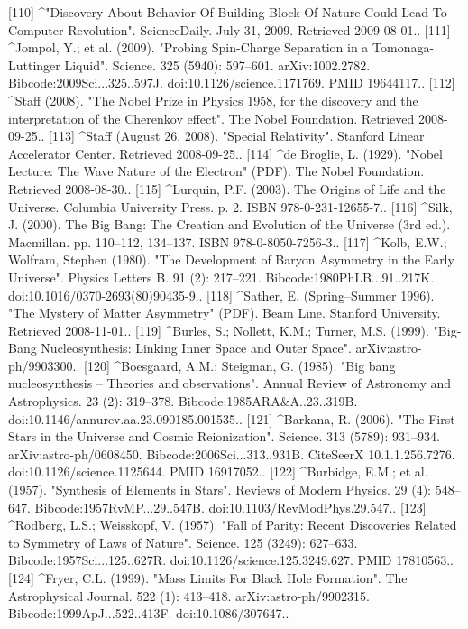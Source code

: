 [110]
^"Discovery About Behavior Of Building Block Of Nature Could Lead To Computer Revolution". ScienceDaily. July 31, 2009. Retrieved 2009-08-01..
[111]
^Jompol, Y.; et al. (2009). "Probing Spin-Charge Separation in a Tomonaga-Luttinger Liquid". Science. 325 (5940): 597–601. arXiv:1002.2782. Bibcode:2009Sci...325..597J. doi:10.1126/science.1171769. PMID 19644117..
[112]
^Staff (2008). "The Nobel Prize in Physics 1958, for the discovery and the interpretation of the Cherenkov effect". The Nobel Foundation. Retrieved 2008-09-25..
[113]
^Staff (August 26, 2008). "Special Relativity". Stanford Linear Accelerator Center. Retrieved 2008-09-25..
[114]
^de Broglie, L. (1929). "Nobel Lecture: The Wave Nature of the Electron" (PDF). The Nobel Foundation. Retrieved 2008-08-30..
[115]
^Lurquin, P.F. (2003). The Origins of Life and the Universe. Columbia University Press. p. 2. ISBN 978-0-231-12655-7..
[116]
^Silk, J. (2000). The Big Bang: The Creation and Evolution of the Universe (3rd ed.). Macmillan. pp. 110–112, 134–137. ISBN 978-0-8050-7256-3..
[117]
^Kolb, E.W.; Wolfram, Stephen (1980). "The Development of Baryon Asymmetry in the Early Universe". Physics Letters B. 91 (2): 217–221. Bibcode:1980PhLB...91..217K. doi:10.1016/0370-2693(80)90435-9..
[118]
^Sather, E. (Spring–Summer 1996). "The Mystery of Matter Asymmetry" (PDF). Beam Line. Stanford University. Retrieved 2008-11-01..
[119]
^Burles, S.; Nollett, K.M.; Turner, M.S. (1999). "Big-Bang Nucleosynthesis: Linking Inner Space and Outer Space". arXiv:astro-ph/9903300..
[120]
^Boesgaard, A.M.; Steigman, G. (1985). "Big bang nucleosynthesis – Theories and observations". Annual Review of Astronomy and Astrophysics. 23 (2): 319–378. Bibcode:1985ARA&A..23..319B. doi:10.1146/annurev.aa.23.090185.001535..
[121]
^Barkana, R. (2006). "The First Stars in the Universe and Cosmic Reionization". Science. 313 (5789): 931–934. arXiv:astro-ph/0608450. Bibcode:2006Sci...313..931B. CiteSeerX 10.1.1.256.7276. doi:10.1126/science.1125644. PMID 16917052..
[122]
^Burbidge, E.M.; et al. (1957). "Synthesis of Elements in Stars". Reviews of Modern Physics. 29 (4): 548–647. Bibcode:1957RvMP...29..547B. doi:10.1103/RevModPhys.29.547..
[123]
^Rodberg, L.S.; Weisskopf, V. (1957). "Fall of Parity: Recent Discoveries Related to Symmetry of Laws of Nature". Science. 125 (3249): 627–633. Bibcode:1957Sci...125..627R. doi:10.1126/science.125.3249.627. PMID 17810563..
[124]
^Fryer, C.L. (1999). "Mass Limits For Black Hole Formation". The Astrophysical Journal. 522 (1): 413–418. arXiv:astro-ph/9902315. Bibcode:1999ApJ...522..413F. doi:10.1086/307647..
